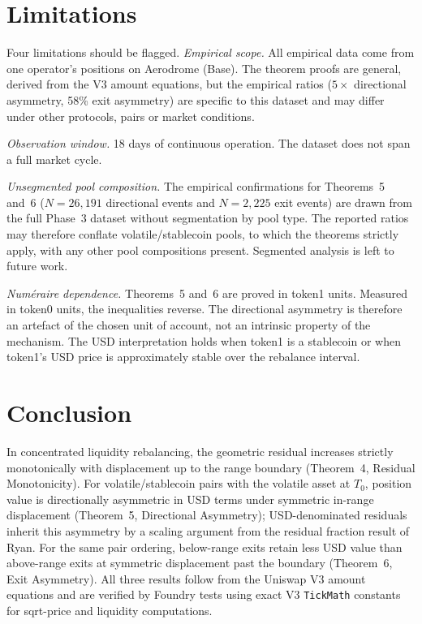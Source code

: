 \documentclass[11pt,a4paper]{article}
\theoremstyle{definition}
\begin{document}
\section{Limitations}\label{sec:limitations}

Four limitations should be flagged. \emph{Empirical scope.} All empirical data come from one operator's positions on Aerodrome (Base). The theorem proofs are general, derived from the V3 amount equations, but the empirical ratios ($5\times$ directional asymmetry, 58\% exit asymmetry) are specific to this dataset and may differ under other protocols, pairs or market conditions.

\emph{Observation window.} 18 days of continuous operation. The dataset does not span a full market cycle.

\emph{Unsegmented pool composition.} The empirical confirmations for Theorems~5 and~6 ($N = 26{,}191$ directional events and $N = 2{,}225$ exit events) are drawn from the full Phase~3 dataset without segmentation by pool type. The reported ratios may therefore conflate volatile/stablecoin pools, to which the theorems strictly apply, with any other pool compositions present. Segmented analysis is left to future work.

\emph{Num\'eraire dependence.} Theorems~5 and~6 are proved in token1 units. Measured in token0 units, the inequalities reverse. The directional asymmetry is therefore an artefact of the chosen unit of account, not an intrinsic property of the mechanism. The USD interpretation holds when token1 is a stablecoin or when token1's USD price is approximately stable over the rebalance interval.

\section{Conclusion}

In concentrated liquidity rebalancing, the geometric residual increases strictly monotonically with displacement up to the range boundary (Theorem~4, Residual Monotonicity). For volatile/stablecoin pairs with the volatile asset at $T_0$, position value is directionally asymmetric in USD terms under symmetric in-range displacement (Theorem~5, Directional Asymmetry); USD-denominated residuals inherit this asymmetry by a scaling argument from the residual fraction result of Ryan\cite{ryan2026a}. For the same pair ordering, below-range exits retain less USD value than above-range exits at symmetric displacement past the boundary (Theorem~6, Exit Asymmetry). All three results follow from the Uniswap V3 amount equations and are verified by Foundry tests using exact V3 \texttt{TickMath} constants for sqrt-price and liquidity computations.
\end{document}
